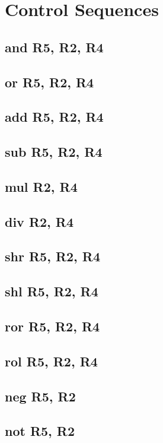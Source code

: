 \documentclass{article}
\begin{document}
\section{Control Sequences}
    \subsection{and R5, R2, R4} \label{AND}
        
    \subsection{or R5, R2, R4} \label{OR}
        
    \subsection{add R5, R2, R4} \label{ADD}
        
    \subsection{sub R5, R2, R4} \label{SUB}
        
    \subsection{mul R2, R4} \label{MUL}
        
    \subsection{div R2, R4} \label{DIV}
        
    \subsection{shr R5, R2, R4} \label{SHR}
        
    \subsection{shl R5, R2, R4} \label{SHL}
        
    \subsection{ror R5, R2, R4} \label{ROR}
        
    \subsection{rol R5, R2, R4} \label{ROL}
        
    \subsection{neg R5, R2} \label{NEG}
        
    \subsection{not R5, R2} \label{NOT}
        
\end{document}
